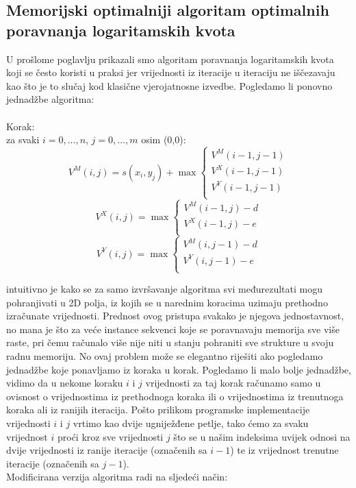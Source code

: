 \documentclass[a4paper]{article}
\newcommand\tab[1][1cm]{\hspace*{#1}}
\begin{document}
\subsection{Memorijski optimalniji algoritam optimalnih poravnanja logaritamskih kvota}
U prošlome poglavlju prikazali smo algoritam poravnanja logaritamskih kvota koji se često koristi u praksi jer vrijednosti iz iteracije u iteraciju ne iščezavaju kao što je to slučaj kod klasične vjerojatnosne izvedbe. Pogledamo li ponovno jednadžbe algoritma:\\\\
Korak:\\
\tab za svaki $i=0,...,n$, $j=0,...,m$ osim (0,0):\\
\begin{equation*}
     V^M(i,j) = s(x_i,y_j) + \max
    \begin{cases}
      V^M(i-1,j-1)\\
      V^X(i-1,j-1)\\
      V^Y(i-1,j-1)\\          
    \end{cases}
\end{equation*}
\begin{equation*}
     V^X(i,j) = \max
    \begin{cases}
      V^M(i-1,j) - d\\
      V^X(i-1,j) - e\\
    \end{cases}   
\end{equation*}
\begin{equation*}
     V^Y(i,j) = \max
    \begin{cases}
      V^M(i,j-1) -d\\
      V^Y(i,j-1) - e\\         
    \end{cases}
\end{equation*}

intuitivno je kako se za samo izvršavanje algoritma svi međurezultati mogu pohranjivati u 2D polja, iz kojih se u narednim koracima uzimaju prethodno izračunate vrijednosti. Prednost ovog pristupa svakako je njegova jednostavnost, no mana je što za veće instance sekvenci koje se poravnavaju memorija sve više raste, pri čemu računalo više nije niti u stanju pohraniti sve strukture u svoju radnu memoriju. No ovaj problem može se elegantno riješiti ako pogledamo jednadžbe koje ponavljamo iz koraka u korak. Pogledamo li malo bolje jednadžbe, vidimo da u nekome koraku $i$ i $j$ vrijednosti za taj korak računamo samo u ovisnost o vrijednostima iz prethodnoga koraka ili o vrijednostima iz trenutnoga koraka ali iz ranijih iteracija. Pošto prilikom programske implementacije vrijednosti $i$ i $j$ vrtimo kao dvije ugniježđene petlje, tako ćemo za svaku vrijednost $i$ proći kroz sve vrijednosti $j$ što se u našim indeksima uvijek odnosi na dvije vrijednosti iz ranije iteracije (označenih sa $i - 1$) te iz vrijednost trenutne iteracije (označenih sa $j - 1$).\\
Modificirana verzija algoritma radi na sljedeći način:
\end{document}
